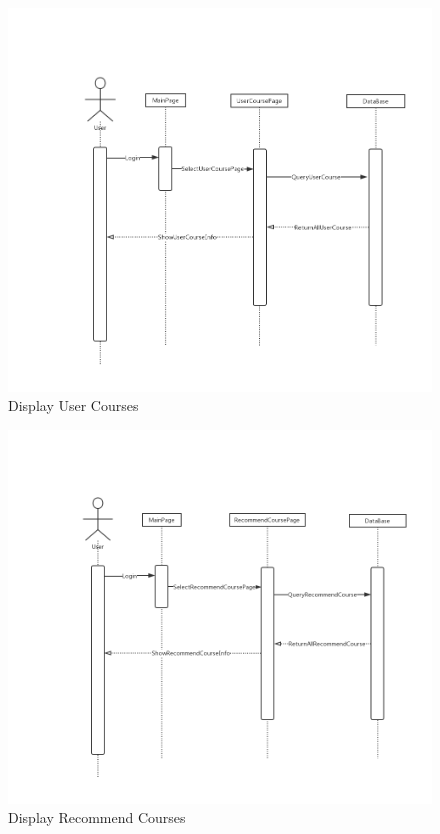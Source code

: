 \documentclass[16pt]{scrreprt}
\begin{document}
\begin{figure}[H]
    \includegraphics[width=\linewidth]{./FuncPhoto/7.png}   
    \caption{Display User Courses}
\end{figure}

\begin{figure}[H]
    \includegraphics[width=\linewidth]{./FuncPhoto/8.png}   
    \caption{Display Recommend Courses}
\end{figure}
\end{document}
